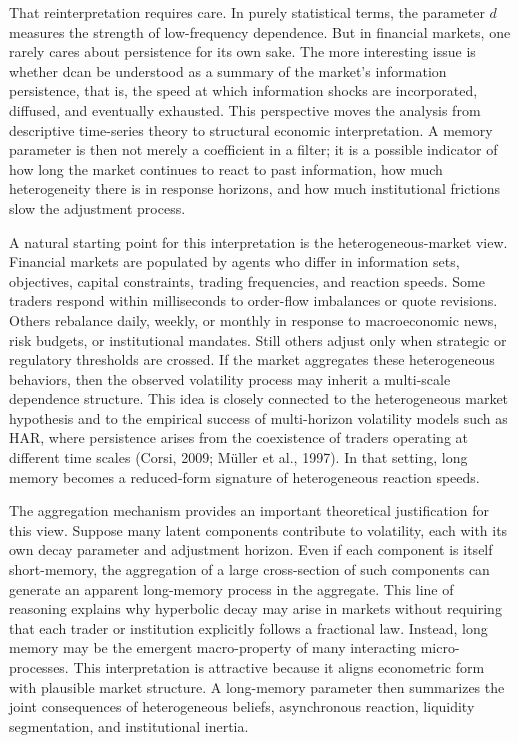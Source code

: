 \documentclass[12pt]{article}
\begin{document}
That reinterpretation requires care. In purely statistical terms, the parameter $d$measures the strength of low-frequency dependence. But in financial markets, one rarely cares about persistence for its own sake. The more interesting issue is whether dcan be understood as a summary of the market's information persistence, that is, the speed at which information shocks are incorporated, diffused, and eventually exhausted. This perspective moves the analysis from descriptive time-series theory to structural economic interpretation. A memory parameter is then not merely a coefficient in a filter; it is a possible indicator of how long the market continues to react to past information, how much heterogeneity there is in response horizons, and how much institutional frictions slow the adjustment process.

A natural starting point for this interpretation is the heterogeneous-market view. Financial markets are populated by agents who differ in information sets, objectives, capital constraints, trading frequencies, and reaction speeds. Some traders respond within milliseconds to order-flow imbalances or quote revisions. Others rebalance daily, weekly, or monthly in response to macroeconomic news, risk budgets, or institutional mandates. Still others adjust only when strategic or regulatory thresholds are crossed. If the market aggregates these heterogeneous behaviors, then the observed volatility process may inherit a multi-scale dependence structure. This idea is closely connected to the heterogeneous market hypothesis and to the empirical success of multi-horizon volatility models such as HAR, where persistence arises from the coexistence of traders operating at different time scales (Corsi, 2009; M\"uller et al., 1997). In that setting, long memory becomes a reduced-form signature of heterogeneous reaction speeds.

The aggregation mechanism provides an important theoretical justification for this view. Suppose many latent components contribute to volatility, each with its own decay parameter and adjustment horizon. Even if each component is itself short-memory, the aggregation of a large cross-section of such components can generate an apparent long-memory process in the aggregate. This line of reasoning explains why hyperbolic decay may arise in markets without requiring that each trader or institution explicitly follows a fractional law. Instead, long memory may be the emergent macro-property of many interacting micro-processes. This interpretation is attractive because it aligns econometric form with plausible market structure. A long-memory parameter then summarizes the joint consequences of heterogeneous beliefs, asynchronous reaction, liquidity segmentation, and institutional inertia.
\end{document}
